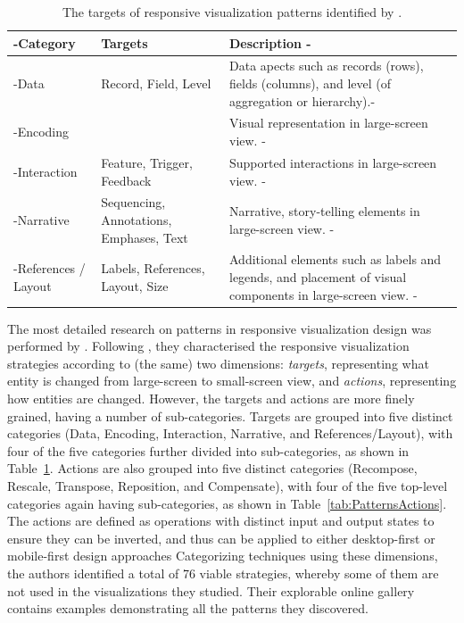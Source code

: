 \begin{table}[tp]
\tablestretch
{}
\centering
\begin{tabularx}{\linewidth}{>{\kern-\tabcolsep}l>{\raggedright}p{}X<{\kern-\tabcolsep}}
\toprule
Category & Targets & Description \\
\midrule
Data        & Record, Field, Level &
Data apects such as records (rows), fields (columns), and level (of aggregation or hierarchy).\\
Encoding    & &
Visual representation in large-screen view. \\
Interaction & Feature, Trigger, Feedback &
Supported interactions in large-screen view. \\
Narrative   & Sequencing, Annotations, Emphases, Text &
Narrative, story-telling elements in large-screen view. \\
References / Layout & Labels, References, Layout, Size &
Additional elements such as labels and legends, and
placement of visual components in large-screen view. \\
\bottomrule
\end{tabularx}
\caption[Targets of Responsive Visualization Patterns]{
The targets of responsive visualization patterns identified by
\textcite{DesignPatternsTradeOffsRespVis}.
}
\label{tab:PatternsTargets}
\end{table}



The most detailed research on patterns in responsive visualization
design was performed by \textcite{DesignPatternsTradeOffsRespVis}.
Following \textcite{TechniquesForFlexibleRespVisDesign}, they
characterised the responsive visualization strategies according to
(the same) two dimensions: \emph{targets}, representing what entity is
changed from large-screen to small-screen view, and \emph{actions},
representing how entities are changed. However, the targets and
actions are more finely grained, having a number of sub-categories.
%
Targets are grouped into five distinct categories (Data, Encoding,
Interaction, Narrative, and References/Layout), with four of the five
categories further divided into sub-categories, as shown in
Table~\ref{tab:PatternsTargets}.
%
Actions are also grouped into five distinct categories (Recompose,
Rescale, Transpose, Reposition, and Compensate), with four of the five
top-level categories again having sub-categories, as shown in
Table~\ref{tab:PatternsActions}. The actions are defined as operations
with distinct input and output states to ensure they can be inverted,
and thus can be applied to either desktop-first or mobile-first design
approaches
%
Categorizing techniques using these dimensions, the authors identified
a total of 76 viable strategies, whereby some of them are not used in
the visualizations they studied. Their explorable online gallery
\parencite{DesignPatternsTradeOffsRespVisGallery} contains examples
demonstrating all the patterns they discovered.



